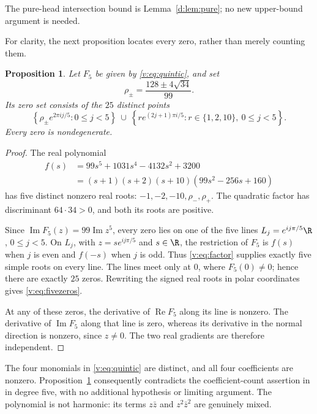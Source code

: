 \documentclass[UTF8,11pt]{ctexart}
\newtheorem{prop}[thm]{Proposition}
\theoremstyle{definition}
\numberwithin{equation}{section}
\DeclareMathOperator{\Rea}{Re}\DeclareMathOperator{\Ima}{Im}
\begin{document}
The pure-head intersection bound is Lemma~\ref{d:lem:pure};
no new upper-bound argument is needed.

For clarity, the next proposition locates every zero, rather than merely
counting them.
\begin{prop}\label{v:prop:five}
Let $F_5$ be given by \eqref{v:eq:quintic}, and set
\[
 \rho_\pm=\frac{128\pm4\sqrt{34}}{99}.
\]
Its zero set consists of the $25$ distinct points
\begin{equation}\label{v:eq:fivezeros}
 \left\{\rho_\pm e^{2\pi i j/5}:0\le j<5\right\}
 \ \cup\
 \left\{r e^{(2j+1)\pi i/5}:r\in\{1,2,10\},\ 0\le j<5\right\}.
\end{equation}
Every zero is nondegenerate.
\end{prop}
\begin{proof}
The real polynomial
\begin{equation}\label{v:eq:factor}
 \begin{split}
 f(s)&=99s^5+1031s^4-4132s^2+3200\\
     &=(s+1)(s+2)(s+10)(99s^2-256s+160)
 \end{split}
\end{equation}
has five distinct nonzero real roots: $-1,-2,-10,\rho_-,\rho_+$.
The quadratic factor has discriminant $64\cdot34>0$, and both its
roots are positive.

Since $\Ima F_5(z)=99\Ima z^5$, every zero lies on one of the five
lines $L_j=e^{ij\pi/5}\R$, $0\le j<5$. On $L_j$, with
$z=s e^{ij\pi/5}$ and $s\in\R$, the restriction of $F_5$ is $f(s)$
when $j$ is even and $f(-s)$ when $j$ is odd.
Thus \eqref{v:eq:factor} supplies exactly five simple roots on every line.
The lines meet only at $0$, where $F_5(0)\ne0$; hence there are exactly
$25$ zeros. Rewriting the signed real roots in polar coordinates gives
\eqref{v:eq:fivezeros}.

At any of these zeros, the derivative of $\Rea F_5$ along its line is
nonzero. The derivative of $\Ima F_5$ along that line is zero, whereas
its derivative in the normal direction is nonzero, since $z\ne0$.
The two real gradients are therefore independent.
\end{proof}

The four monomials in \eqref{v:eq:quintic} are distinct, and all four
coefficients are nonzero. Proposition~\ref{v:prop:five} consequently
contradicts the coefficient-count assertion in
\cite[Remark~4.4, p.~16]{SZ24} in degree five, with no additional
hypothesis or limiting argument. The polynomial is not harmonic:
its terms $z\bar z$ and $z^2\bar z^2$ are genuinely mixed.
\end{document}
